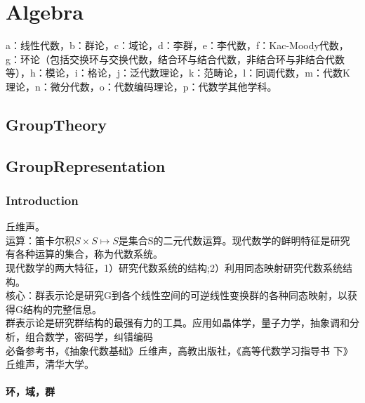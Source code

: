 

\chapter{Algebra}


a：线性代数，b：群论，c：域论，d：李群，e：李代数，f：Kac-Moody代数，g：环论（包括交换环与交换代数，结合环与结合代数，非结合环与非结合代数等），h：模论，i：格论，j：泛代数理论，k：范畴论，l：同调代数，m：代数K理论，n：微分代数，o：代数编码理论，p：代数学其他学科。


\section{GroupTheory}

\section{GroupRepresentation}

\subsection{Introduction}
丘维声。\\
运算：笛卡尔积$S \times S \mapsto S$是集合S的二元代数运算。现代数学的鲜明特征是研究有各种运算的集合，称为代数系统。\\
现代数学的两大特征，1）研究代数系统的结构;2）利用同态映射研究代数系统结构。\\
核心：群表示论是研究G到各个线性空间的可逆线性变换群的各种同态映射，以获得G结构的完整信息。\\
群表示论是研究群结构的最强有力的工具。应用如晶体学，量子力学，抽象调和分析，组合数学，密码学，纠错编码\\
必备参考书，《抽象代数基础》丘维声，高教出版社，《高等代数学习指导书 下》丘维声，清华大学。

\subsubsection{环，域，群}

